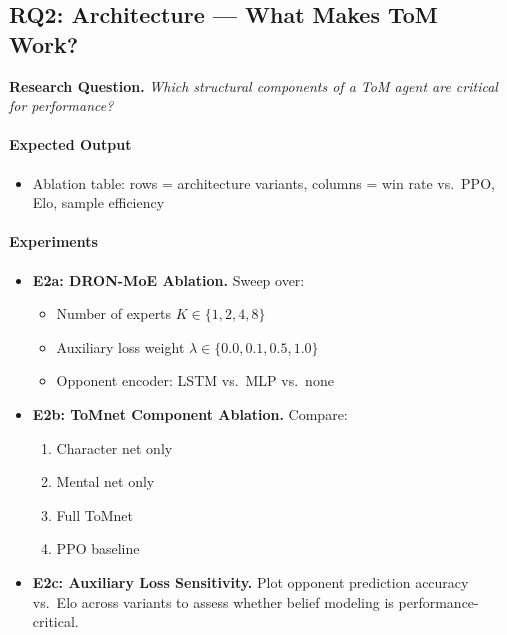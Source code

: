 \documentclass{article}
\begin{document}
\subsection{RQ2: Architecture --- What Makes ToM Work?}

\textbf{Research Question.}  
\emph{Which structural components of a ToM agent are critical for performance?}

\paragraph{Expected Output}
\begin{itemize}
    \item Ablation table: rows = architecture variants, columns = win rate vs.\ PPO, Elo, sample efficiency
\end{itemize}

\paragraph{Experiments}
\begin{itemize}
    \item \textbf{E2a: DRON-MoE Ablation.}  
    Sweep over:
    \begin{itemize}
        \item Number of experts $K \in \{1,2,4,8\}$
        \item Auxiliary loss weight $\lambda \in \{0.0, 0.1, 0.5, 1.0\}$
        \item Opponent encoder: LSTM vs.\ MLP vs.\ none
    \end{itemize}

    \item \textbf{E2b: ToMnet Component Ablation.}  
    Compare:
    \begin{enumerate}
        \item Character net only
        \item Mental net only
        \item Full ToMnet
        \item PPO baseline
    \end{enumerate}

    \item \textbf{E2c: Auxiliary Loss Sensitivity.}  
    Plot opponent prediction accuracy vs.\ Elo across variants to assess whether belief modeling is performance-critical.
\end{itemize}
\end{document}
